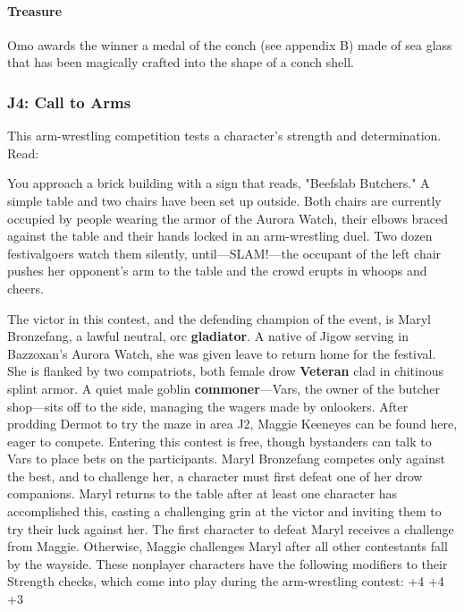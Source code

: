\documentclass[10pt,a4,twoside,twocolumn,openany,nodeprecatedcode]{dndbook}
\begin{document}
\paragraph{Treasure}
Omo awards the winner a medal of the conch (see appendix B) made of sea glass that has been magically crafted into the shape of a conch shell.
\subsubsection{J4: Call to Arms}
This arm-wrestling competition tests a character's strength and determination. Read:
\begin{DndReadAloud}{}
You approach a brick building with a sign that reads, "Beefslab Butchers." A simple table and two chairs have been set up outside. Both chairs are currently occupied by people wearing the armor of the Aurora Watch, their elbows braced against the table and their hands locked in an arm-wrestling duel. Two dozen festivalgoers watch them silently, until—SLAM!—the occupant of the left chair pushes her opponent's arm to the table and the crowd erupts in whoops and cheers.
\end{DndReadAloud}

The victor in this contest, and the defending champion of the event, is Maryl Bronzefang, a lawful neutral, orc \textbf{gladiator}. A native of Jigow serving in Bazzoxan's Aurora Watch, she was given leave to return home for the festival. She is flanked by two compatriots, both female drow \textbf{Veteran} clad in chitinous splint armor. A quiet male goblin \textbf{commoner}—Vars, the owner of the butcher shop—sits off to the side, managing the wagers made by onlookers.
After prodding Dermot to try the maze in area J2, Maggie Keeneyes can be found here, eager to compete.
Entering this contest is free, though bystanders can talk to Vars to place bets on the participants.
Maryl Bronzefang competes only against the best, and to challenge her, a character must first defeat one of her drow companions. Maryl returns to the table after at least one character has accomplished this, casting a challenging grin at the victor and inviting them to try their luck against her. The first character to defeat Maryl receives a challenge from Maggie. Otherwise, Maggie challenges Maryl after all other contestants fall by the wayside. These nonplayer characters have the following modifiers to their Strength checks, which come into play during the arm-wrestling contest:
{{+4}}
{{+4}}
{{+3}}
\end{document}
